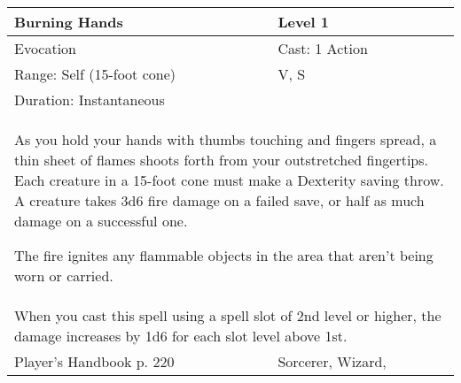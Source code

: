 \documentclass[11pt]{report}
\begin{document}
\begin{table}[H]
	\begin{tabular}{||p{6cm}|p{6cm}||}
		\hline\hline
		\bf{Burning Hands} & Level 1\\ \hline
		Evocation & Cast: 1 Action\\ \hline
		Range: Self (15-foot cone) & V, S\\ \hline
		Duration: Instantaneous & \\ \hline
		\multicolumn{2}{||p{12cm}||}{As you hold your hands with thumbs touching and fingers spread, a thin sheet of flames shoots forth from your outstretched fingertips. Each creature in a 15-foot cone must make a Dexterity saving throw. A creature takes 3d6 fire damage on a failed save, or half as much damage on a successful one. 

The fire ignites any flammable objects in the area that aren’t being worn or carried.}\\ \hline
		\multicolumn{2}{||p{12cm}||}{When you cast this spell using a spell slot of 2nd level or higher, the damage increases by 1d6 for each slot level above 1st.}\\ \hline
Player's Handbook p. 220 & Sorcerer, Wizard, \\ \hline\hline
	\end{tabular}
\end{table}
\end{document}
